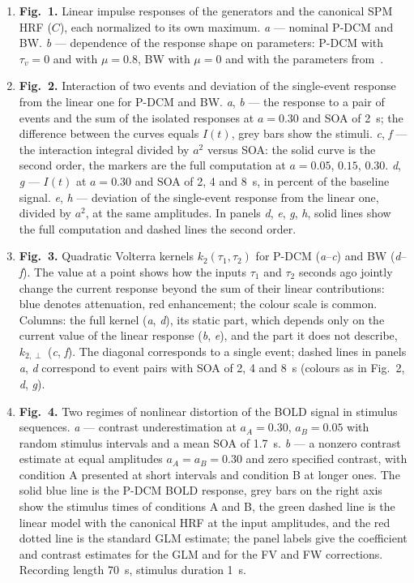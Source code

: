 \documentclass[11pt,twoside,a4paper]{article}
\begin{document}
\vspace{0.5\baselineskip}
\begin{enumerate}\setlength{\itemsep}{2pt}
\item \textbf{Fig.~1.} Linear impulse responses of the generators and the canonical SPM HRF ($C$), each normalized to its own maximum. \textit{a} --- nominal P-DCM and BW. \textit{b} --- dependence of the response shape on parameters: P-DCM with $\tau_v=0$ and with $\mu=0.8$, BW with $\mu=0$ and with the parameters from~\cite{friston2003}.
\item \textbf{Fig.~2.} Interaction of two events and deviation of the single-event response from the linear one for P-DCM and BW. \textit{a}, \textit{b} --- the response to a pair of events and the sum of the isolated responses at $a=0.30$ and SOA of 2~s; the difference between the curves equals $I(t)$, grey bars show the stimuli. \textit{c}, \textit{f} --- the interaction integral divided by $a^2$ versus SOA: the solid curve is the second order, the markers are the full computation at $a=0.05$, $0.15$, $0.30$. \textit{d}, \textit{g} --- $I(t)$ at $a=0.30$ and SOA of 2, 4 and 8~s, in percent of the baseline signal. \textit{e}, \textit{h} --- deviation of the single-event response from the linear one, divided by $a^2$, at the same amplitudes. In panels \textit{d}, \textit{e}, \textit{g}, \textit{h}, solid lines show the full computation and dashed lines the second order.
\item \textbf{Fig.~3.} Quadratic Volterra kernels $k_2(\tau_1,\tau_2)$ for P-DCM (\textit{a}--\textit{c}) and BW (\textit{d}--\textit{f}). The value at a point shows how the inputs $\tau_1$ and $\tau_2$ seconds ago jointly change the current response beyond the sum of their linear contributions: blue denotes attenuation, red enhancement; the colour scale is common. Columns: the full kernel (\textit{a}, \textit{d}), its static part, which depends only on the current value of the linear response (\textit{b}, \textit{e}), and the part it does not describe, $k_{2,\perp}$ (\textit{c}, \textit{f}). The diagonal corresponds to a single event; dashed lines in panels \textit{a}, \textit{d} correspond to event pairs with SOA of 2, 4 and 8~s (colours as in Fig.~2, \textit{d}, \textit{g}).
\item \textbf{Fig.~4.} Two regimes of nonlinear distortion of the BOLD signal in stimulus sequences. \textit{a} --- contrast underestimation at $a_A=0.30$, $a_B=0.05$ with random stimulus intervals and a mean SOA of 1.7~s. \textit{b} --- a nonzero contrast estimate at equal amplitudes $a_A=a_B=0.30$ and zero specified contrast, with condition A presented at short intervals and condition B at longer ones. The solid blue line is the P-DCM BOLD response, grey bars on the right axis show the stimulus times of conditions A and B, the green dashed line is the linear model with the canonical HRF at the input amplitudes, and the red dotted line is the standard GLM estimate; the panel labels give the coefficient and contrast estimates for the GLM and for the FV and FW corrections. Recording length 70~s, stimulus duration 1~s.

\end{enumerate}
\end{document}
